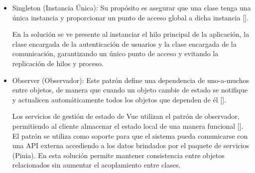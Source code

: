 \begin{itemize}
\item Singleton (Instancia Única): Su propósito es asegurar que una clase tenga una única instancia y proporcionar un punto de acceso global a dicha instancia [\cite{97}].

En la solución se ve presente al instanciar el hilo principal de la aplicación, la clase encargada de la autenticación de usuarios y la clase encargada de la comunicación, garantizando un único punto de acceso y evitando la replicación de hilos y proceso.

\item Observer (Observador): Este patrón define una dependencia de uno-a-muchos entre objetos, de manera que cuando un objeto cambie de estado se notifique y actualicen automáticamente todos los objetos que dependen de él [\cite{97}].

Los servicios de gestión de estado de Vue utilizan el patrón de observador, permitiendo al cliente almacenar el estado local de una manera funcional [\cite{52}]. El patrón se utiliza como soporte para que el sistema pueda comunicarse con una API externa accediendo a los datos brindados por el paquete de servicios (Pinia).  En esta solución permite mantener consistencia entre objetos relacionados sin aumentar el acoplamiento entre clases.

\end{itemize}
%

